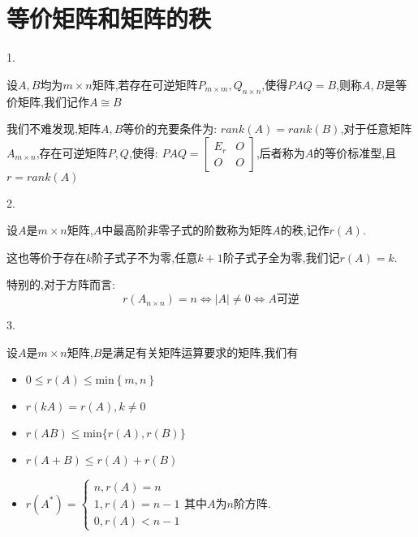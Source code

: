 \section{等价矩阵和矩阵的秩}
\begin{definition}[等价矩阵和矩阵的秩]
	1. 
	
	设$A,B$均为$m\times n$矩阵,若存在可逆矩阵$P_{m\times m},Q_{n\times n}$,使得$PAQ=B$,则称$A,B$是等价矩阵,我们记作$A\cong B$
	
	我们不难发现,矩阵$A,B$等价的充要条件为:  $rank(A)=rank(B)$,对于任意矩阵$A_{m\times n}$,存在可逆矩阵$P,Q$,使得:  $PAQ=\left[
	\begin{matrix}
		E_{r}&O\\
		O&O
	\end{matrix}
	\right]$,后者称为$A$的等价标准型,且$r=rank(A)$
	
	
	2.
	
	设$A$是$m\times n$矩阵,$A$中最高阶非零子式的阶数称为矩阵$A$的秩,记作$r(A)$.
	
	这也等价于存在$k$阶子式子不为零,任意$k+1$阶子式子全为零,我们记$r(A)=k$.
	
	特别的,对于方阵而言:  
	$$r(A_{n\times n})=n\Leftrightarrow |A|\neq 0\Leftrightarrow A\text{可逆}$$
	
	3. 
	
	设$A$是$m\times n$矩阵,$B$是满足有关矩阵运算要求的矩阵,我们有
	\begin{itemize}
		\item $0\leq r(A) \leq \text{min}\left\lbrace m,n \right\rbrace$
		\item $r(kA)=r(A),k\neq 0$
		\item $r(AB)\leq \text{min}\{r(A),r(B)\}$
		\item $r(A+B)\leq r(A)+r(B)$
		\item $r(A^{*})=\left\lbrace 
		\begin{array}{l}
			n,r(A)=n\\
			1,r(A)=n-1\\
			0,r(A)<n-1
		\end{array}
		\right. \text{其中}A\text{为}n\text{阶方阵}.$
	\end{itemize}
	
\end{definition}
